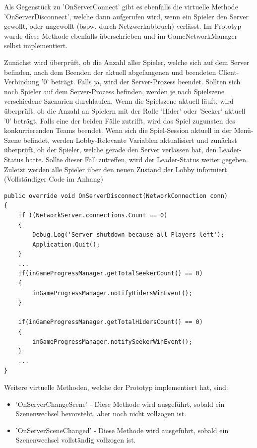 Als Gegenstück zu 'OnServerConnect' gibt es ebenfalls die virtuelle Methode 'OnServerDisconnect', welche dann aufgerufen wird, wenn ein Spieler den Server gewollt, oder ungewollt (bspw. durch Netzwerkabbruch) verlässt. Im Prototyp wurde diese Methode ebenfalls überschrieben und im GameNetworkManager selbst implementiert. 

Zunächst wird überprüft, ob die Anzahl aller Spieler, welche sich auf dem Server befinden, nach dem Beenden der aktuell abgefangenen und beendeten Client-Verbindung '0' beträgt. Falls ja, wird der Server-Prozess beendet. Sollten sich noch Spieler auf dem Server-Prozess befinden, werden je nach Spielszene verschiedene Szenarien durchlaufen. Wenn die Spielszene aktuell läuft, wird überprüft, ob die Anzahl an Spielern mit der Rolle 'Hider' oder 'Seeker' aktuell '0' beträgt. Falls eine der beiden Fälle zutrifft, wird das Spiel zugunsten des konkurrierenden Teams beendet. Wenn sich die Spiel-Session aktuell in der Menü-Szene befindet, werden Lobby-Relevante Variablen aktualisiert und zunächst überprüft, ob der Spieler, welche gerade den Server verlassen hat, den Leader-Status hatte. Sollte dieser Fall zutreffen, wird der Leader-Status weiter gegeben. Zuletzt werden alle Spieler über den neuen Zustand der Lobby informiert. (Vollständiger Code im Anhang)

\begin{lstlisting}[caption= GameNetworkManager.cs OnServerDisconnect()]
public override void OnServerDisconnect(NetworkConnection conn)
{
	if ((NetworkServer.connections.Count == 0)
	{
		Debug.Log('Server shutdown because all Players left');
		Application.Quit();
	}
	...
	if(inGameProgressManager.getTotalSeekerCount() == 0)
	{
		inGameProgressManager.notifyHidersWinEvent();
	}

	if(inGameProgressManager.getTotalHidersCount() == 0)
	{
		inGameProgressManager.notifySeekerWinEvent();
	}
	...
}
\end{lstlisting}

Weitere virtuelle Methoden, welche der Prototyp implementiert hat, sind:

\begin{itemize}
	\item 'OnServerChangeScene' - Diese Methode wird ausgeführt, sobald ein Szenenwechsel bevorsteht, aber noch nicht vollzogen ist.
	\item 'OnServerSceneChanged' - Diese Methode wird ausgeführt, sobald ein Szenenwechsel vollständig vollzogen ist.
\end{itemize}

